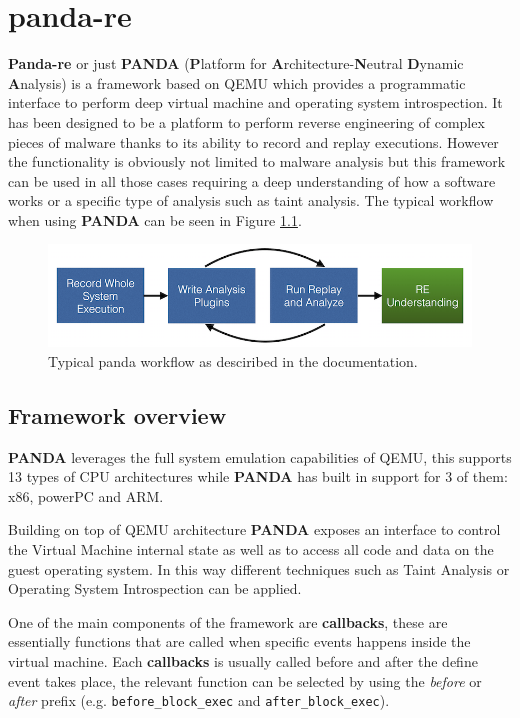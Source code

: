 \chapter{panda-re}

\textbf{Panda-re} or just \textbf{PANDA} (\textbf{P}latform  for  \textbf{A}rchitecture-\textbf{N}eutral  \textbf{D}ynamic  \textbf{A}nalysis) is a framework based on QEMU which provides a programmatic interface to perform deep virtual machine and operating system introspection. It has been designed to be a platform to perform reverse engineering of complex pieces of malware thanks to its ability to record and replay executions. However the functionality is obviously not limited to malware analysis but this framework can be used in all those cases requiring a deep understanding of how a software works or a specific type of analysis such as taint analysis. The typical workflow when using \textbf{PANDA} can be seen in Figure \ref{fig:wkflow}.

\begin{figure}[htp]
\centering
\includegraphics[width=\linewidth]{images/panda_workflow.png}
\caption{Typical panda workflow as desciribed in the documentation.}
\label{fig:wkflow}
\end{figure}


\section{Framework overview}

\textbf{PANDA} leverages the full system emulation capabilities of QEMU, this supports 13 types of CPU architectures while \textbf{PANDA} has built in support for 3 of them: x86, powerPC and ARM. 

Building on top of QEMU architecture \textbf{PANDA} exposes an interface to control the Virtual Machine internal state as well as to access all code and data on the guest operating system. In this way different techniques such as Taint Analysis or Operating System Introspection can be applied.

One of the main components of the framework are \textbf{callbacks}, these are essentially functions that are called when specific events happens inside the virtual machine. Each \textbf{callbacks} is usually called before and after the define event takes place, the relevant function can be selected by using the \textit{before} or \textit{after} prefix (e.g. \lstinline{before_block_exec} and \lstinline{after_block_exec}).

